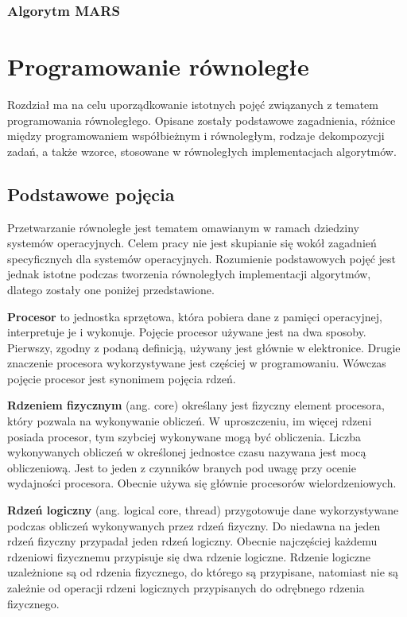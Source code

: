 \documentclass[12pt]{article}
\begin{document}
\subsubsection{Algorytm MARS}
\newpage

\section{Programowanie równoległe}
Rozdział ma na celu uporządkowanie istotnych pojęć związanych z tematem programowania
równoległego. Opisane zostały podstawowe zagadnienia, różnice między programowaniem współbieżnym
i równoległym, rodzaje dekompozycji zadań, a także wzorce, stosowane w równoległych 
implementacjach algorytmów.

\subsection{Podstawowe pojęcia}
Przetwarzanie równoległe jest tematem omawianym w ramach dziedziny systemów operacyjnych.
Celem pracy nie jest skupianie się wokół zagadnień specyficznych dla systemów operacyjnych.
Rozumienie podstawowych pojęć jest jednak istotne podczas tworzenia równoległych implementacji
algorytmów, dlatego zostały one poniżej przedstawione. 

\textbf{Procesor} to jednostka sprzętowa, która pobiera dane z pamięci operacyjnej, interpretuje je
i wykonuje. Pojęcie procesor używane jest na dwa sposoby. Pierwszy, zgodny z podaną definicją, używany
jest głównie w elektronice. Drugie znaczenie procesora wykorzystywane jest częściej w programowaniu.
Wówczas pojęcie procesor jest synonimem pojęcia rdzeń.

\textbf{Rdzeniem fizycznym} (ang. core) określany jest fizyczny element procesora, który pozwala na wykonywanie obliczeń.
W uproszczeniu, im więcej rdzeni posiada procesor, tym szybciej wykonywane mogą być obliczenia.
Liczba wykonywanych obliczeń w określonej jednostce czasu nazywana jest mocą obliczeniową.
Jest to jeden z czynników branych pod uwagę przy ocenie wydajności procesora. Obecnie używa się
głównie procesorów wielordzeniowych.

\textbf{Rdzeń logiczny} (ang. logical core, thread) przygotowuje dane wykorzystywane podczas obliczeń wykonywanych przez rdzeń fizyczny.
Do niedawna na jeden rdzeń fizyczny przypadał jeden rdzeń logiczny.
Obecnie najczęściej każdemu rdzeniowi fizycznemu przypisuje się dwa rdzenie logiczne.
Rdzenie logiczne uzależnione są od rdzenia fizycznego, do którego są przypisane, natomiast nie są zależnie
od operacji rdzeni logicznych przypisanych do odrębnego rdzenia fizycznego.
\end{document}
